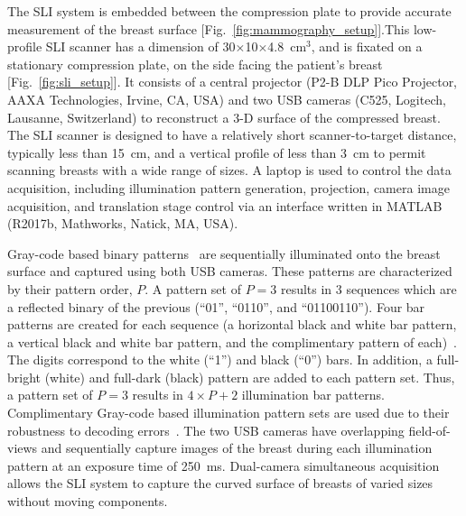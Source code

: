 The SLI system is embedded between the compression plate to provide accurate measurement of the breast surface [Fig.~\ref{fig:mammography_setup}].This low-profile SLI scanner has a dimension of 30$\times$10$\times$4.8~cm$^3$, and is fixated on a stationary compression plate, on the side facing the patient's breast [Fig.~\ref{fig:sli_setup}]. It consists of a central projector (P2-B DLP Pico Projector, AAXA Technologies, Irvine, CA, USA) and two USB cameras (C525, Logitech, Lausanne, Switzerland) to reconstruct a 3-D surface of the compressed breast. The SLI scanner is designed to have a relatively short scanner-to-target distance, typically less than 15~cm, and a vertical profile of less than 3~cm to permit scanning breasts with a wide range of sizes. A laptop is used to control the data acquisition, including illumination pattern generation, projection, camera image acquisition, and translation stage control via an interface written in MATLAB (R2017b, Mathworks, Natick, MA, USA).

Gray-code based binary patterns~\cite{Inokuchi1984} are sequentially illuminated onto the breast surface and captured using both USB cameras. These patterns are characterized by their pattern order, $P$. A pattern set of $P=3$ results in 3 sequences which are a reflected binary of the previous (``01'', ``0110'', and ``01100110''). Four bar patterns are created for each sequence (a horizontal black and white bar pattern, a vertical black and white bar pattern, and the complimentary pattern of each)~\cite{Sels2019}. The digits correspond to the white (``1'') and black (``0'') bars. In addition, a full-bright (white) and full-dark (black) pattern are added to each pattern set. Thus, a pattern set of $P=3$ results in $4\times P+2$ illumination bar patterns. Complimentary Gray-code based illumination pattern sets are used due to their robustness to decoding errors~\cite{Moreno2012}. The two USB cameras have overlapping field-of-views and sequentially capture images of the breast during each illumination pattern at an exposure time of 250~ms. Dual-camera simultaneous acquisition allows the SLI system to capture the curved surface of breasts of varied sizes without moving components. 

